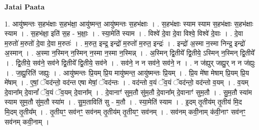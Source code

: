 \documentclass[17pt]{extarticle}
\begin{document}
\textbf{Jatai Paata} \newline

1. आयु॑ष्मन्तः स॒हभ॑क्षाः स॒हभ॑क्षा॒ आयु॑ष्मन्त॒ आयु॑ष्मन्तः स॒हभ॑क्षाः । . स॒हभ॑क्षाः स्याम स्याम स॒हभ॑क्षाः स॒हभ॑क्षाः स्याम । . स॒हभ॑क्षा॒ इति॑ स॒ह - भ॒क्षाः॒ । . स्या॒मेति॑ स्याम । . विश्वे॑ दे॒वा दे॒वा विश्वे॒ विश्वे॑ दे॒वाः । . दे॒वा म॒रुतो॑ म॒रुतो॑ दे॒वा दे॒वा म॒रुतः॑ । . म॒रुत॒ इन्द्र॒ इन्द्रो॑ म॒रुतो॑ म॒रुत॒ इन्द्रः॑ । . इन्द्रो॑ अ॒स्मा न॒स्मा निन्द्र॒ इन्द्रो॑ अ॒स्मान् । . अ॒स्मा न॒स्मिन् न॒स्मिन् न॒स्मा न॒स्मा न॒स्मिन्न् । . अ॒स्मिन् द्वि॒तीये᳚ द्वि॒तीये॒ ऽस्मिन् न॒स्मिन् द्वि॒तीये᳚ । . द्वि॒तीये॒ सव॑ने॒ सव॑ने द्वि॒तीये᳚ द्वि॒तीये॒ सव॑ने । . सव॑ने॒ न न सव॑ने॒ सव॑ने॒ न । . न ज॑ह्युर् जह्यु॒र् न न ज॑ह्युः । . ज॒ह्यु॒रिति॑ जह्युः । . आयु॑ष्मन्तः प्रि॒यम् प्रि॒य मायु॑ष्मन्त॒ आयु॑ष्मन्तः प्रि॒यम् । . प्रि॒य मे॑षा मेषाम् प्रि॒यम् प्रि॒य मे॑षाम् । . ए॒षां॒ ॅवद॑न्तो॒ वद॑न्त एषा मेषां॒ ॅवद॑न्तः । . वद॑न्तो व॒यं ॅव॒यं ॅवद॑न्तो॒ वद॑न्तो व॒यम् । . व॒यम् दे॒वाना᳚म् दे॒वानां᳚ ॅव॒यं ॅव॒यम् दे॒वाना᳚म् । . दे॒वानाꣳ॑ सुम॒तौ सु॑म॒तौ दे॒वाना᳚म् दे॒वानाꣳ॑ सुम॒तौ । . सु॒म॒तौ स्या॑म स्याम सुम॒तौ सु॑म॒तौ स्या॑म । . सु॒म॒ताविति॑ सु - म॒तौ । . स्या॒मेति॑ स्याम । . इ॒दम् तृ॒तीय॑म् तृ॒तीय॑ मि॒द मि॒दम् तृ॒तीय᳚म् । . तृ॒तीयꣳ॒॒ सव॑नꣳ॒॒ सव॑नम् तृ॒तीय॑म् तृ॒तीयꣳ॒॒ सव॑नम् । . सव॑नम् कवी॒नाम् क॑वी॒नाꣳ सव॑नꣳ॒॒ सव॑नम् कवी॒नाम् । \newline
\end{document}
